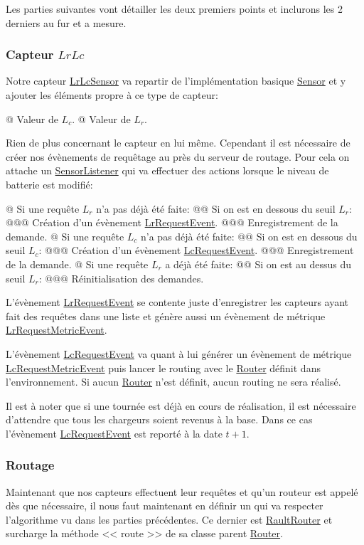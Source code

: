 \documentclass[final]{polytech/polytech}
\newcommand{\klass}[1]{\hyperref[class:#1]{#1}}
\begin{document}
			Les parties suivantes vont détailler les deux premiers points et inclurons les 2 derniers au fur et a mesure.
			
			\subsubsection{Capteur $LrLc$}
				Notre capteur \klass{LrLcSensor} va repartir de l'implémentation basique \klass{Sensor} et y ajouter les éléments propre à ce type de capteur:
				\begin{easylist}
					@ Valeur de $L_c$.
					@ Valeur de $L_r$.
				\end{easylist}
				
				Rien de plus concernant le capteur en lui même.
				Cependant il est nécessaire de créer nos évènements de requêtage au près du serveur de routage.
				Pour cela on attache un \klass{SensorListener} qui va effectuer des actions lorsque le niveau de batterie est modifié:
				\begin{easylist}
					@ Si une requête $L_r$ n'a pas déjà été faite:
					@@ Si on est en dessous du seuil $L_r$:
					@@@ Création d'un évènement \klass{LrRequestEvent}.
					@@@ Enregistrement de la demande.
					@ Si une requête $L_c$ n'a pas déjà été faite:
					@@ Si on est en dessous du seuil $L_c$:
					@@@ Création d'un évènement \klass{LcRequestEvent}.
					@@@ Enregistrement de la demande.
					@ Si une requête $L_r$ a déjà été faite:
					@@ Si on est au dessus du seuil $L_r$:
					@@@ Réinitialisation des demandes.
				\end{easylist}
				
				L'évènement \klass{LrRequestEvent} se contente juste d'enregistrer les capteurs ayant fait des requêtes dans une liste et génère aussi un évènement de métrique \klass{LrRequestMetricEvent}.
				
				L'évènement \klass{LcRequestEvent} va quant à lui générer un évènement de métrique \klass{LcRequestMetricEvent} puis lancer le routing avec le \klass{Router} définit dans l'environnement.
				Si aucun \klass{Router} n'est définit, aucun routing ne sera réalisé.
				
				Il est à noter que si une tournée est déjà en cours de réalisation, il est nécessaire d'attendre que tous les chargeurs soient revenus à la base.
				Dans ce cas l'évènement \klass{LcRequestEvent} est reporté à la date $t+1$.
				
			\subsubsection{Routage}
				Maintenant que nos capteurs effectuent leur requêtes et qu'un routeur est appelé dès que nécessaire, il nous faut maintenant en définir un qui va respecter l'algorithme vu dans les parties précédentes.
				Ce dernier est \klass{RaultRouter} et surcharge la méthode << route >> de sa classe parent \klass{Router}.
				
\end{document}
